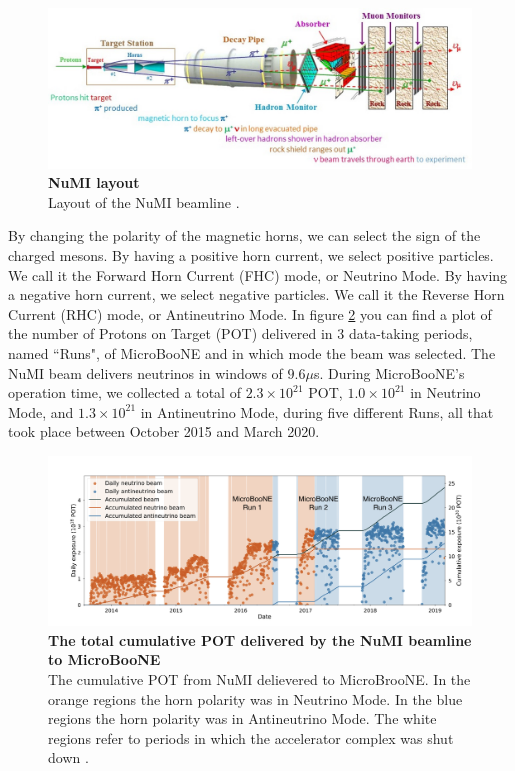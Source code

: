 \begin{figure}[h!]
    \centering
    \includegraphics[width=140mm]{Figures/numi.jpg}
    \caption[NuMI layout]{{\textbf{NuMI layout}} \\Layout of the NuMI beamline \cite{numi}.}
    \label{fig:numi}
\end{figure}
  
By changing the polarity of the magnetic horns, we can select the sign of the charged mesons. By having a positive horn current, we select positive particles. We call it the Forward Horn Current (FHC) mode, or Neutrino Mode. By having a negative horn current, we select negative particles. We call it the Reverse Horn Current (RHC) mode, or Antineutrino Mode. In figure \ref{beam_mode_uboone} you can find a plot of the number of Protons on Target (POT) delivered in 3 data-taking periods, named ``Runs", of MicroBooNE and in which mode the beam was selected. The NuMI beam delivers neutrinos in windows of $9.6 \mu$s. During MicroBooNE's operation time, we collected a total of $2.3\times 10^{21}$ POT, $1.0\times10^{21}$ in Neutrino Mode, and $1.3\times10^{21}$ in Antineutrino Mode, during five different Runs, all that took place between October 2015 and March 2020. 
 
\begin{figure}[h!]
    \centering
    \includegraphics[width=150mm]{Figures/beam_mode_uboone.png}
    \caption[The total cumulative POT delivered by the NuMI beamline to MicroBooNE]{{\textbf{The total cumulative POT delivered by the NuMI beamline to MicroBooNE}}\\The cumulative POT from NuMI delievered to MicroBrooNE. In the orange regions the horn polarity was in Neutrino Mode. In the blue regions the horn polarity was in Antineutrino Mode. The white regions refer to periods in which the accelerator complex was shut down \cite{krish_phd}.}
    \label{beam_mode_uboone}
\end{figure}
  
